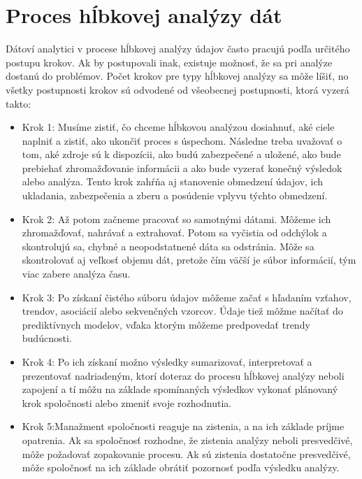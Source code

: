 \documentclass[10pt,twoside,slovak,a4paper]{article}
\begin{document}
\section{Proces hĺbkovej analýzy dát} 
Dátoví analytici v procese hĺbkovej analýzy údajov často pracujú podľa určitého postupu krokov. Ak by postupovali inak, existuje možnosť, že sa pri analýze dostanú do problémov. Počet krokov pre typy hĺbkovej analýzy sa môže líšiť, no všetky postupnosti krokov sú odvodené od všeobecnej postupnosti, ktorá vyzerá takto:\\
\begin{itemize}
\item Krok 1: Musíme zistiť, čo chceme hĺbkovou analýzou dosiahnuť, aké ciele naplniť a zistiť, ako ukončiť proces s úspechom. Následne treba uvažovať o tom, aké zdroje sú k dispozícii, ako budú zabezpečené a uložené, ako bude prebiehať zhromažďovanie informácii a ako bude vyzerať konečný výsledok alebo analýza. Tento krok zahŕňa aj stanovenie obmedzení údajov, ich ukladania, zabezpečenia a zberu a posúdenie vplyvu týchto obmedzení. \\
\item Krok 2: Až potom začneme pracovať so samotnými dátami. Môžeme ich zhromažďovať, nahrávať a extrahovať. Potom sa vyčistia od odchýlok a skontrolujú sa, chybné a neopodstatnené dáta sa odstránia. Môže sa skontrolovať aj veľkosť objemu dát, pretože čím väčší je súbor informácií, tým viac zabere analýza času. \\
\item Krok 3: Po získaní čistého súboru údajov môžeme začať s hľadaním vzťahov, trendov, asociácií alebo sekvenčných vzorcov. Údaje tiež môžme načítať do prediktívnych modelov, vďaka ktorým môžeme predpovedať trendy budúcnosti. \\
\item Krok 4: Po ich získaní možno výsledky sumarizovať, interpretovať a prezentovať nadriadeným, ktorí doteraz do procesu hĺbkovej analýzy neboli zapojení a tí môžu na základe spomínaných výsledkov vykonať plánovaný krok spoločnosti alebo zmeniť svoje rozhodnutia.\\
\item Krok 5:Manažment spoločnosti reaguje na zistenia, a na ich základe príjme opatrenia. Ak sa spoločnosť rozhodne, že zistenia analýzy neboli  presvedčivé, môže požadovať zopakovanie procesu. Ak sú zistenia dostatočne presvedčivé, môže spoločnosť na ich základe obrátiť pozornosť podľa výsledku analýzy.\cite{CraigSTD}\cite{IBM}\\
\end{itemize}
\end{document}
